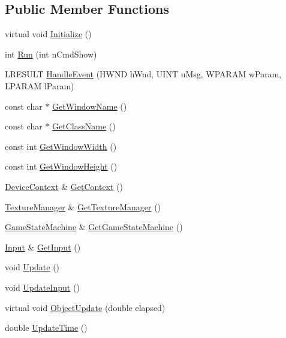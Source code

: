 \subsection*{Public Member Functions}
\begin{DoxyCompactItemize}
\item 
virtual void \mbox{\hyperlink{class_app_ab6135ee4083dbe23d9f61fe7cd63291e}{Initialize}} ()
\item 
int \mbox{\hyperlink{class_app_a7dc44068c220d91cc98ce4afe7f97c97}{Run}} (int n\+Cmd\+Show)
\item 
L\+R\+E\+S\+U\+LT \mbox{\hyperlink{class_app_a194f25e8c5de264e292f548c3682a818}{Handle\+Event}} (H\+W\+ND h\+Wnd, U\+I\+NT u\+Msg, W\+P\+A\+R\+AM w\+Param, L\+P\+A\+R\+AM l\+Param)
\item 
const char $\ast$ \mbox{\hyperlink{class_app_a1d70a48fa0c76a8404ba3b63f0ecab47}{Get\+Window\+Name}} ()
\item 
const char $\ast$ \mbox{\hyperlink{class_app_abeb7ab54b4636fc9632edbe0892e01b3}{Get\+Class\+Name}} ()
\item 
const int \mbox{\hyperlink{class_app_ad88558728f682ef1a479928b0f0dc89f}{Get\+Window\+Width}} ()
\item 
const int \mbox{\hyperlink{class_app_a3b0f8f2b5f85a72589a12846594eaf6e}{Get\+Window\+Height}} ()
\item 
\mbox{\hyperlink{struct_app_1_1_device_context}{Device\+Context}} \& \mbox{\hyperlink{class_app_a9ea6b9c0b558a55ac215083ad76e515b}{Get\+Context}} ()
\item 
\mbox{\hyperlink{class_texture_manager}{Texture\+Manager}} \& \mbox{\hyperlink{class_app_ade63fd2ae6ef0daf37a85329b93e3662}{Get\+Texture\+Manager}} ()
\item 
\mbox{\hyperlink{class_game_state_machine}{Game\+State\+Machine}} \& \mbox{\hyperlink{class_app_a282a5089103c9da94adcac6092047dac}{Get\+Game\+State\+Machine}} ()
\item 
\mbox{\hyperlink{class_input}{Input}} \& \mbox{\hyperlink{class_app_a53841688199515d638baac375243e13f}{Get\+Input}} ()
\item 
void \mbox{\hyperlink{class_app_ab080252cbdac21758081b29324351e34}{Update}} ()
\item 
void \mbox{\hyperlink{class_app_ac7ad6827367a558ac066bb897d0e1ef8}{Update\+Input}} ()
\item 
virtual void \mbox{\hyperlink{class_app_a83fc920c6295c48847eb408eaa4afaf1}{Object\+Update}} (double elapsed)
\item 
double \mbox{\hyperlink{class_app_af9d5285ac1a905e871d1c0b7a4c14c2c}{Update\+Time}} ()

\end{DoxyCompactItemize}
